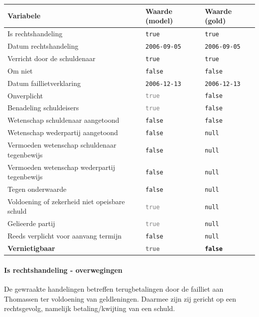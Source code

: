 \documentclass[
  dutch,
  a4paper,
]{article}
\begin{document}
\begin{center}
\small
\begin{tabular}{@{}p{7.4cm}p{2.6cm}p{2.6cm}@{}}
\toprule
Variabele & Waarde (model) & Waarde (gold) \\
\midrule
Is rechtshandeling & \texttt{true} & \texttt{true} \\
Datum rechtshandeling & \texttt{2006-09-05} & \texttt{2006-09-05} \\
Verricht door de schuldenaar & \texttt{true} & \texttt{true} \\
Om niet & \texttt{false} & \texttt{false} \\
Datum faillietverklaring & \texttt{2006-12-13} & \texttt{2006-12-13} \\
Onverplicht & \textcolor{gray}{\texttt{true}} & \texttt{false} \\
Benadeling schuldeisers & \textcolor{gray}{\texttt{true}} & \texttt{false} \\
Wetenschap schuldenaar aangetoond & \texttt{false} & \texttt{false} \\
Wetenschap wederpartij aangetoond & \texttt{false} & \texttt{null} \\
Vermoeden wetenschap schuldenaar tegenbewijs & \texttt{false} & \texttt{null} \\
Vermoeden wetenschap wederpartij tegenbewijs & \texttt{false} & \texttt{null} \\
Tegen onderwaarde & \texttt{false} & \texttt{null} \\
Voldoening of zekerheid niet opeisbare schuld & \textcolor{gray}{\texttt{true}} & \texttt{null} \\
Gelieerde partij & \textcolor{gray}{\texttt{true}} & \texttt{null} \\
Reeds verplicht voor aanvang termijn & \texttt{false} & \texttt{null} \\
\textbf{Vernietigbaar} & \textbf{\textcolor{gray}{\texttt{true}}} & \textbf{\texttt{false}} \\
\bottomrule
\end{tabular}
\end{center}

\paragraph{Is rechtshandeling - overwegingen}\label{is-rechtshandeling---overwegingen-76}

De gewraakte handelingen betreffen terugbetalingen door de failliet aan Thomassen ter voldoening van geldleningen. Daarmee zijn zij gericht op een rechtsgevolg, namelijk betaling/kwijting van een schuld.
\end{document}
